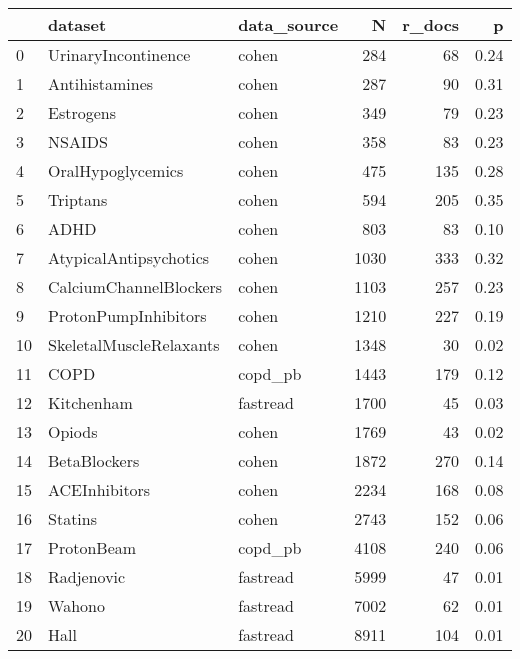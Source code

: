 \begin{tabular}{lllrrr}
\toprule
{} &                  dataset & data\_source &     N &  r\_docs &    p \\
\midrule
0  &      UrinaryIncontinence &       cohen &   284 &      68 & 0.24 \\
1  &           Antihistamines &       cohen &   287 &      90 & 0.31 \\
2  &                Estrogens &       cohen &   349 &      79 & 0.23 \\
3  &                   NSAIDS &       cohen &   358 &      83 & 0.23 \\
4  &        OralHypoglycemics &       cohen &   475 &     135 & 0.28 \\
5  &                 Triptans &       cohen &   594 &     205 & 0.35 \\
6  &                     ADHD &       cohen &   803 &      83 & 0.10 \\
7  &   AtypicalAntipsychotics &       cohen &  1030 &     333 & 0.32 \\
8  &   CalciumChannelBlockers &       cohen &  1103 &     257 & 0.23 \\
9  &     ProtonPumpInhibitors &       cohen &  1210 &     227 & 0.19 \\
10 &  SkeletalMuscleRelaxants &       cohen &  1348 &      30 & 0.02 \\
11 &                     COPD &     copd\_pb &  1443 &     179 & 0.12 \\
12 &               Kitchenham &    fastread &  1700 &      45 & 0.03 \\
13 &                   Opiods &       cohen &  1769 &      43 & 0.02 \\
14 &             BetaBlockers &       cohen &  1872 &     270 & 0.14 \\
15 &            ACEInhibitors &       cohen &  2234 &     168 & 0.08 \\
16 &                  Statins &       cohen &  2743 &     152 & 0.06 \\
17 &               ProtonBeam &     copd\_pb &  4108 &     240 & 0.06 \\
18 &               Radjenovic &    fastread &  5999 &      47 & 0.01 \\
19 &                   Wahono &    fastread &  7002 &      62 & 0.01 \\
20 &                     Hall &    fastread &  8911 &     104 & 0.01 \\
\bottomrule
\end{tabular}
